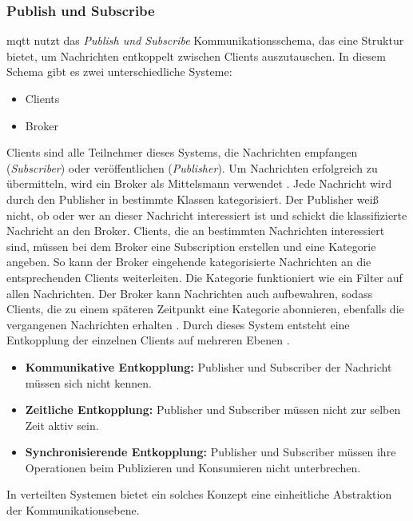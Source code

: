 \subsubsection{Publish und Subscribe} \label{s:publish-subscribe}
\ac{mqtt} nutzt das \textit{Publish und Subscribe} Kommunikationsschema, das eine Struktur bietet, um Nachrichten entkoppelt zwischen Clients auszutauschen. In diesem Schema gibt es zwei unterschiedliche Systeme:
\begin{itemize}
    \item Clients
    \item Broker
\end{itemize}
Clients sind alle Teilnehmer dieses Systems, die Nachrichten empfangen (\textit{Subscriber}) oder veröffentlichen (\textit{Publisher}). Um Nachrichten erfolgreich zu übermitteln, wird ein Broker als Mittelsmann verwendet \cite{teamGettingStartedMQTT}.
Jede Nachricht wird durch den Publisher in bestimmte Klassen kategorisiert. Der Publisher wei{\ss} nicht, ob oder wer an dieser Nachricht interessiert ist und schickt die klassifizierte Nachricht an den Broker.
Clients, die an bestimmten Nachrichten interessiert sind, müssen bei dem Broker eine Subscription erstellen und eine Kategorie angeben.
So kann der Broker eingehende kategorisierte Nachrichten an die entsprechenden Clients weiterleiten. Die Kategorie funktioniert wie ein Filter auf allen Nachrichten.
Der Broker kann Nachrichten auch aufbewahren, sodass Clients, die zu einem späteren Zeitpunkt eine Kategorie abonnieren, ebenfalls die vergangenen Nachrichten erhalten \cite{EverythingYouNeed}.
Durch dieses System entsteht eine Entkopplung der einzelnen Clients auf mehreren Ebenen \cite{teamPublishSubscribeMQTT}.
\begin{itemize}
    \item \textbf{Kommunikative Entkopplung:} Publisher und Subscriber der Nachricht müssen sich nicht kennen.
    \item \textbf{Zeitliche Entkopplung:} Publisher und Subscriber müssen nicht zur selben Zeit aktiv sein.
    \item \textbf{Synchronisierende Entkopplung:} Publisher und Subscriber müssen ihre Operationen beim Publizieren und Konsumieren nicht unterbrechen.
\end{itemize}
In verteilten Systemen bietet ein solches Konzept eine einheitliche Abstraktion der Kommunikationsebene.
\cite{domingusDistributedSystemsIntroduction2020}
